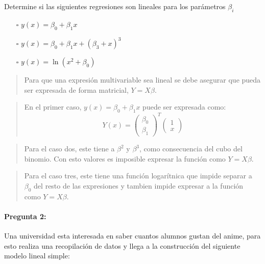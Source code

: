 \documentclass[]{article}
\let\oldparagraph\paragraph
\renewcommand{\paragraph}[1]{\oldparagraph{#1}\mbox{}}
\begin{document}
Determine si las siguientes regresiones son lineales para los parámetros
\(\beta_{i}\)

\begin{itemize}
\item[$\square$]
  \(y(x) = \beta_{0} + \beta_{1} x\)
\item[$\square$]
  \(y(x) = \beta_{0} + \beta_{1} x + (\beta_{3}+x)^{3}\)
\item[$\square$]
  \(y(x) = \ln(x^{2}+\beta_{0})\)
\end{itemize}

\begin{quote}
Para que una expresión multivariable sea lineal se debe asegurar que
pueda ser expresada de forma matricial, \(Y = X \beta\).
\end{quote}

\begin{quote}
En el primer caso, \(y(x) = \beta_{0} + \beta_{1} x\) puede ser
expresada como:
\[ Y(x) =  \left( \begin{array}{ll} \beta_{0} \\ \beta_{1} \end{array} \right)^T \left( \begin{array}{ll} 1 \\ x \end{array} \right) \]
\end{quote}

\begin{quote}
Para el caso dos, este tiene a \(\beta^2\) y \(\beta^3\), como
consecuencia del cubo del binomio. Con esto valores es imposible
expresar la función como \(Y = X \beta\).
\end{quote}

\begin{quote}
Para el caso tres, este tiene una función logarítnica que impide separar
a \(\beta_{0}\) del resto de las expresiones y tambien impide expresar a
la función como \(Y = X \beta\).
\end{quote}

\hypertarget{pregunta-2}{%
\paragraph{\texorpdfstring{\textbf{Pregunta
2:}}{Pregunta 2:}}\label{pregunta-2}}

Una universidad esta interesada en saber cuantos alumnos gustan del
anime, para esto realiza una recopilación de datos y llega a la
construcción del siguiente modelo lineal simple:
\end{document}
